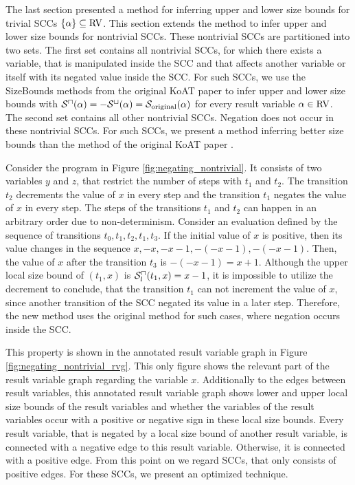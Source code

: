 The last section presented a method for inferring upper and lower size bounds for trivial SCCs $\lbrace \alpha \rbrace \subseteq \text{RV}$.
This section extends the method to infer upper and lower size bounds for nontrivial SCCs.
These nontrivial SCCs are partitioned into two sets.
The first set contains all nontrivial SCCs, for which there exists a variable, that is manipulated inside the SCC and that affects another variable or itself with its negated value inside the SCC.
For such SCCs, we use the SizeBounds methods from the original KoAT paper \cite{koat} to infer upper and lower size bounds with ${\mathcal{S}^\sqcap}(\alpha) = -{\mathcal{S}^\sqcup}(\alpha) = \mathcal{S}_{\text{original}}(\alpha)$ for every result variable $\alpha \in \text{RV}$.
The second set contains all other nontrivial SCCs.
Negation does not occur in these nontrivial SCCs.
For such SCCs, we present a method inferring better size bounds than the method of the original KoAT paper \cite{koat}.

\begin{example}
  
  Consider the program in Figure \ref{fig:negating_nontrivial}.
  It consists of two variables $y$ and $z$, that restrict the number of steps with $t_1$ and $t_2$.
  The transition $t_2$ decrements the value of $x$ in every step and the transition $t_1$ negates the value of $x$ in every step.
  The steps of the transitions $t_1$ and $t_2$ can happen in an arbitrary order due to non-determinism.
  Consider an evaluation defined by the sequence of transitions $t_0, t_1, t_2, t_1, t_3$.
  If the initial value of $x$ is positive, then its value changes in the sequence $x, -x, -x-1, -(-x-1), -(-x-1)$.
  Then, the value of $x$ after the transition $t_3$ is $-(-x-1) = x+1$.
  Although the upper local size bound of $(t_1,x)$ is ${\mathcal{S}^\sqcap_l}(t_1,x) = x-1$, it is impossible to utilize the decrement to conclude, that the transition $t_1$ can not increment the value of $x$, since another transition of the SCC negated its value in a later step.
  Therefore, the new method uses the original method for such cases, where negation occurs inside the SCC.
\end{example}



This property is shown in the annotated result variable graph in Figure \ref{fig:negating_nontrivial_rvg}.
This only figure shows the relevant part of the result variable graph regarding the variable $x$.
Additionally to the edges between result variables, this annotated result variable graph shows lower and upper local size bounds of the result variables and whether the variables of the result variables occur with a positive or negative sign in these local size bounds.
Every result variable, that is negated by a local size bound of another result variable, is connected with a negative edge to this result variable.
Otherwise, it is connected with a positive edge.
From this point on we regard SCCs, that only consists of positive edges.
For these SCCs, we present an optimized technique.

